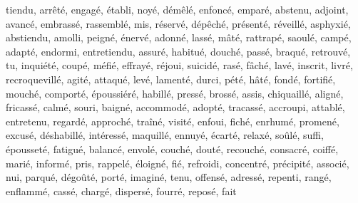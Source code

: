 tiendu, arrêté, engagé, établi, noyé, démêlé, enfoncé, emparé, abstenu, adjoint, avancé, embrassé, rassemblé, mis, réservé, dépêché, présenté, réveillé, asphyxié, abstiendu, amolli, peigné, énervé, adonné, lassé, mâté, rattrapé, saoulé, campé, adapté, endormi, entretiendu, assuré, habitué, douché, passé, braqué, retrouvé, tu, inquiété, coupé, méfié, effrayé, réjoui, suicidé, rasé, fâché, lavé, inscrit, livré, recroquevillé, agité, attaqué, levé, lamenté, durci, pété, hâté, fondé, fortifié, mouché, comporté, époussiéré, habillé, pressé, brossé, assis, chiquaillé, aligné, fricassé, calmé, souri, baigné, accommodé, adopté, tracassé, accroupi, attablé, entretenu, regardé, approché, traîné, visité, enfoui, fiché, enrhumé, promené, excusé, déshabillé, intéressé, maquillé, ennuyé, écarté, relaxé, soûlé, suffi, épousseté, fatigué, balancé, envolé, couché, douté, recouché, consacré, coiffé, marié, informé, pris, rappelé, éloigné, fié, refroidi, concentré, précipité, associé, nui, parqué, dégoûté, porté, imaginé, tenu, offensé, adressé, repenti, rangé, enflammé, cassé, chargé, dispersé, fourré, reposé, fait
